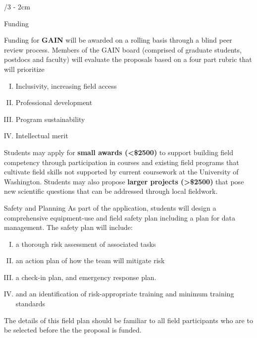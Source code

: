 \documentclass[landscape]{uwposter}
\begin{document}
\begin{frame}
\begin{columns}[onlytextwidth]
\begin{column}{\textwidth/3 - 2cm}
    \begin{block}{Funding}
               
        Funding for \textbf{\alert{GAIN}} will be awarded on a rolling basis through a blind peer review process. Members of the GAIN board (comprised of graduate students, postdocs and faculty) will evaluate the proposals based on a four part rubric that will prioritize 
        \begin{enumerate}[I.]
        \item
        Inclusivity, increasing field access
        \item
        Professional development
        \item
        Program sustainability 
        \item
        Intellectual merit
        \end{enumerate}

        Students may apply for \textbf{small awards (\alert{<\$2500})} to support building field competency through participation in courses and existing field programs that cultivate field skills not supported by current coursework at the University of Washington.
        Students may also propose \textbf{larger projects (\alert{>\$2500})} that pose new scientific questions that can be addressed through local fieldwork.
        

    \end{block}
    
    \begin{block}{Safety and Planning}
    As part of the application, students will design a comprehensive equipment-use and field safety plan including a plan for data management. The safety plan will include:
        \begin{enumerate}[I.]
         \item
    	a thorough risk assessment of associated tasks
    	\item
	an action plan of how the team will mitigate risk
    	\item
	a check-in plan, and emergency response plan.
    	\item
	and an identification of risk-appropriate training and minimum training standards
	\end{enumerate}
	
	The details of this field plan should be familiar to all field participants who are to be selected before the the proposal is funded.
    \end{block}



\end{column}
\end{columns}
\end{frame}
\end{document}
